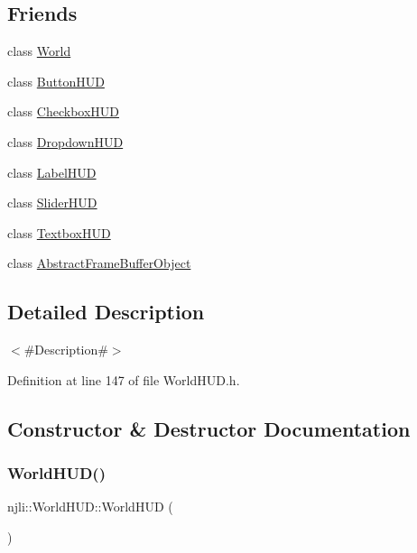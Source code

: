 \subsection*{Friends}
\begin{DoxyCompactItemize}
\item 
class \mbox{\hyperlink{classnjli_1_1_world_h_u_d_a7b4bcdf992c21ae83363f25df05b1d25}{World}}
\item 
class \mbox{\hyperlink{classnjli_1_1_world_h_u_d_a19c07f330269ab1d6555234c92605d56}{Button\+H\+UD}}
\item 
class \mbox{\hyperlink{classnjli_1_1_world_h_u_d_a0aab48d603790a3ca2c4d7dd7ab9e519}{Checkbox\+H\+UD}}
\item 
class \mbox{\hyperlink{classnjli_1_1_world_h_u_d_aff628788b98fce5e2ba538f3d1548af4}{Dropdown\+H\+UD}}
\item 
class \mbox{\hyperlink{classnjli_1_1_world_h_u_d_aa8844d2831cd99e31cc82dd81b171f11}{Label\+H\+UD}}
\item 
class \mbox{\hyperlink{classnjli_1_1_world_h_u_d_a601e2cab15ade2e7f8e72cd6b68c3b1f}{Slider\+H\+UD}}
\item 
class \mbox{\hyperlink{classnjli_1_1_world_h_u_d_a043f6c225e4e72e1152c60f8c442fdc9}{Textbox\+H\+UD}}
\item 
class \mbox{\hyperlink{classnjli_1_1_world_h_u_d_a74840235021f469fe6da7ae7d24c95ad}{Abstract\+Frame\+Buffer\+Object}}
\end{DoxyCompactItemize}


\subsection{Detailed Description}
$<$\#\+Description\#$>$ 

Definition at line 147 of file World\+H\+U\+D.\+h.



\subsection{Constructor \& Destructor Documentation}
\mbox{\label{classnjli_1_1_world_h_u_d_aaa03dd572c9d1a44922a1c200d4192fe}} 
\subsubsection{\texorpdfstring{World\+H\+U\+D()}{WorldHUD()}\hspace{0.1cm}{\footnotesize\ttfamily [1/2]}}
{\footnotesize\ttfamily njli\+::\+World\+H\+U\+D\+::\+World\+H\+UD (\begin{DoxyParamCaption}{ }\end{DoxyParamCaption})}

